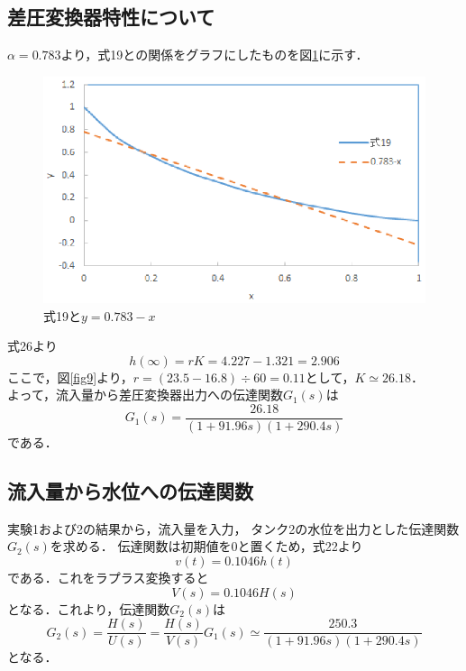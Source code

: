 \documentclass[11pt,a4paper]{jsarticle}
\begin{document}
\newpage
\pagestyle{fancy}
\renewcommand{\headrulewidth}{0.0pt}
\cfoot{}

  \subsection{差圧変換器特性について}
  $\alpha = 0.783$より，式19との関係をグラフにしたものを図\ref{fig12}に示す．
\begin{figure}[b]
 \begin{center}
  \includegraphics[scale=1]{./picture/e6_3.eps}
  \caption{式19と$y = 0.783-x$}
  \label{fig12}
 \end{center}
\end{figure}


式26より
\begin{equation}
 h(\infty) = rK = 4.227 - 1.321 = 2.906
\end{equation}
ここで，図\ref{fig9}より，$r = (23.5-16.8) \div 60 = 0.11$として，$K \simeq 26.18$．\\
よって，流入量から差圧変換器出力への伝達関数$G_1(s)$は
\begin{equation}
 G_1(s)= \frac{26.18}{(1+91.96s)(1+290.4s)}
\end{equation}
である．

\newpage
\pagestyle{fancy}
\renewcommand{\headrulewidth}{0.0pt}
\cfoot{}

  \subsection{流入量から水位への伝達関数}
  実験1および2の結果から，流入量を入力，
  タンク2の水位を出力とした伝達関数$G_2(s)$を求める．
  伝達関数は初期値を0と置くため，式22より
  \begin{equation}
   v(t) = 0.1046 h(t)
  \end{equation}
  である．これをラプラス変換すると
  \begin{equation}
   V(s) = 0.1046H(s)
  \end{equation}
  となる．これより，伝達関数$G_2(s)$は
\begin{equation}
 G_2(s)=\frac{H(s)}{U(s)}=\frac{H(s)}{V(s)} G_1(s) \simeq \frac{250.3}{(1+91.96s)(1+290.4s)}
\end{equation}
となる．
\end{document}
